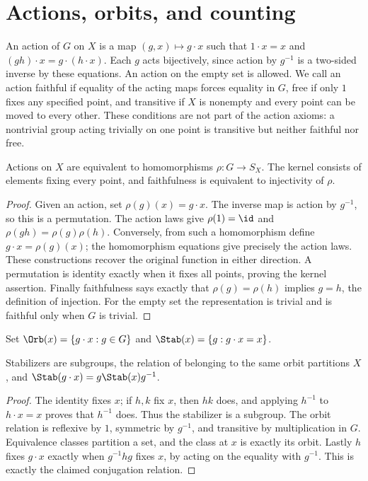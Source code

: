 \chapter{Actions, orbits, and counting}\label{chap:M07.05}

An action of $G$ on $X$ is a map $(g,x)\mapsto g\cdot x$ such that $1\cdot x=x$ and $(gh)\cdot x=g\cdot(h\cdot x)$. Each $g$ acts bijectively, since action by $g^{-1}$ is a two-sided inverse by these equations. An action on the empty set is allowed. We call an action faithful if equality of the acting maps forces equality in $G$, free if only $1$ fixes any specified point, and transitive if $X$ is nonempty and every point can be moved to every other. These conditions are not part of the action axioms: a nontrivial group acting trivially on one point is transitive but neither faithful nor free.

\begin{proposition}\label{prop:actions-permutations}
Actions on $X$ are equivalent to homomorphisms $\rho:G\to S_X$. The kernel consists of elements fixing every point, and faithfulness is equivalent to injectivity of $\rho$.
\end{proposition}
\begin{proof}
Given an action, set $\rho(g)(x)=g\cdot x$. The inverse map is action by $g^{-1}$, so this is a permutation. The action laws give $\rho(1)=\id$ and $\rho(gh)=\rho(g)\rho(h)$. Conversely, from such a homomorphism define $g\cdot x=\rho(g)(x)$; the homomorphism equations give precisely the action laws. These constructions recover the original function in either direction. A permutation is identity exactly when it fixes all points, proving the kernel assertion. Finally faithfulness says exactly that $\rho(g)=\rho(h)$ implies $g=h$, the definition of injection. For the empty set the representation is trivial and is faithful only when $G$ is trivial.
\end{proof}

\begin{definition}
Set $\Orb(x)=\{g\cdot x:g\in G\}$ and $\Stab(x)=\{g:g\cdot x=x\}$.
\end{definition}
\begin{proposition}\label{prop:orbits-stabilizers}
Stabilizers are subgroups, the relation of belonging to the same orbit partitions $X$, and $\Stab(g\cdot x)=g\Stab(x)g^{-1}$.
\end{proposition}
\begin{proof}
The identity fixes $x$; if $h,k$ fix $x$, then $hk$ does, and applying $h^{-1}$ to $h\cdot x=x$ proves that $h^{-1}$ does. Thus the stabilizer is a subgroup. The orbit relation is reflexive by $1$, symmetric by $g^{-1}$, and transitive by multiplication in $G$. Equivalence classes partition a set, and the class at $x$ is exactly its orbit. Lastly $h$ fixes $g\cdot x$ exactly when $g^{-1}hg$ fixes $x$, by acting on the equality with $g^{-1}$. This is exactly the claimed conjugation relation.
\end{proof}


